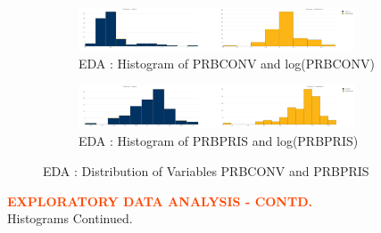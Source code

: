 \begin{figure}[!ht]
	\begin{subfigure}[b]{1.0\textwidth}
		\centering
		\includegraphics[width=0.9\textwidth,height=0.30\textheight]{images/EDA_histograms_prbconv.jpg}
		\caption{EDA : Histogram of PRBCONV and log(PRBCONV)}
		\label{fig:EDA Histogram PRBCONV}
	\end{subfigure}\vspace{3mm}%
	
	\begin{subfigure}[b]{1.0\textwidth}
		\centering
		\includegraphics[width=0.9\textwidth,height=0.30\textheight]{images/EDA_histograms_prbpris.jpg}
		\caption{EDA : Histogram of PRBPRIS and log(PRBPRIS)}
		\label{fig:EDA Histogram PRBPRIS}
	\end{subfigure}
	\label{fig:PRBCONV and PRBPRIS Histogram}
	\caption{EDA : Distribution of Variables PRBCONV and PRBPRIS}
\end{figure}

\pagebreak

\textbf{\textcolor{OrangeRed}{EXPLORATORY DATA ANALYSIS - CONTD.}}\\

Histograms Continued.\\

